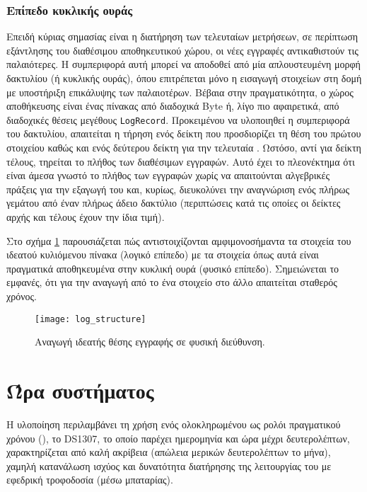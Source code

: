 \subsubsection{Επίπεδο κυκλικής ουράς}

Επειδή κύριας σημασίας είναι η διατήρηση των τελευταίων μετρήσεων, σε περίπτωση
εξάντλησης του διαθέσιμου αποθηκευτικού χώρου, οι νέες εγγραφές αντικαθιστούν
τις παλαιότερες. Η συμπεριφορά αυτή μπορεί να αποδοθεί από μία απλουστευμένη
μορφή δακτυλίου (ή κυκλικής ουράς), όπου επιτρέπεται μόνο η εισαγωγή στοιχείων
στη δομή με υποστήριξη επικάλυψης των παλαιοτέρων. Βέβαια στην πραγματικότητα, ο
χώρος αποθήκευσης είναι ένας πίνακας από διαδοχικά Byte ή, λίγο πιο αφαιρετικά,
από διαδοχικές θέσεις μεγέθους \verb~LogRecord~. Προκειμένου να υλοποιηθεί η
συμπεριφορά του δακτυλίου, απαιτείται η τήρηση ενός δείκτη που προσδιορίζει τη
θέση του πρώτου στοιχείου καθώς και ενός δεύτερου δείκτη για την τελευταία
\parencite[131]{kolias04}. Ωστόσο, αντί για δείκτη τέλους, τηρείται το πλήθος
των διαθέσιμων εγγραφών. Αυτό έχει το πλεονέκτημα ότι είναι άμεσα γνωστό το
πλήθος των εγγραφών χωρίς να απαιτούνται αλγεβρικές πράξεις για την εξαγωγή του
και, κυρίως, διευκολύνει την αναγνώριση ενός πλήρως γεμάτου από έναν πλήρως
άδειο δακτύλιο (περιπτώσεις κατά τις οποίες οι δείκτες αρχής και τέλους έχουν
την ίδια τιμή).

Στο σχήμα \ref{fig:log:structure} παρουσιάζεται πώς αντιστοιχίζονται
αμφιμονοσήμαντα τα στοιχεία του ιδεατού κυλιόμενου πίνακα
(λογικό επίπεδο) με τα στοιχεία όπως αυτά είναι πραγματικά
αποθηκευμένα στην κυκλική ουρά (φυσικό επίπεδο). Σημειώνεται το
εμφανές, ότι για την αναγωγή από το ένα στοιχείο στο άλλο απαιτείται σταθερός
χρόνος.

\begin{figure}
    \caption{Αναγωγή ιδεατής θέσης εγγραφής σε φυσική διεύθυνση.
    \label{fig:log:structure}}
    \begin{center}%
    \texttt{[image: log\_structure]}
    \end{center}
\end{figure}


\section{Ώρα συστήματος}
\label{sec:rtc}

Η υλοποίηση περιλαμβάνει τη χρήση ενός ολοκληρωμένου ως ρολόι πραγματικού χρόνου
(), το DS1307, το οποίο παρέχει ημερομηνία και ώρα
μέχρι δευτερολέπτων, χαρακτηρίζεται από καλή ακρίβεια (απώλεια μερικών
δευτερολέπτων το μήνα), χαμηλή κατανάλωση ισχύος και δυνατότητα διατήρησης της
λειτουργίας του με εφεδρική τροφοδοσία (μέσω μπαταρίας).

